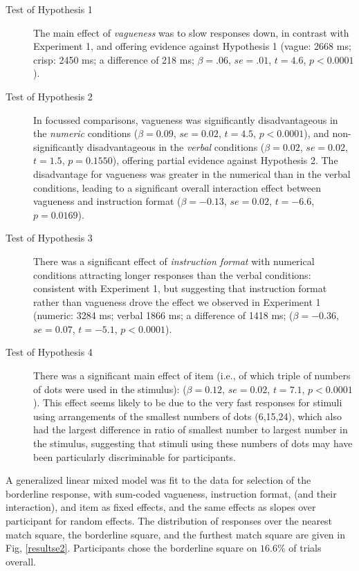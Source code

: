 \begin{description}
	\item [Test of Hypothesis 1] The main effect of \emph{vagueness} was to slow responses down, in contrast with Experiment 1, and offering evidence against Hypothesis 1 (vague: 2668 ms; crisp: 2450 ms; a difference of 218 ms; $\beta=.06$, $se=.01$, $t=4.6$, $p<0.0001$). 
	\item [Test of Hypothesis 2] In focussed comparisons, vagueness was significantly disadvantageous in the \emph{numeric} conditions ($\beta=0.09$, $se=0.02$, $t=4.5$, $p<0.0001$), and non-significantly disadvantageous in the \emph{verbal} conditions ($\beta=0.02$, $se=0.02$, $t=1.5$, $p=0.1550$), offering partial evidence against Hypothesis 2. The disadvantage for vagueness was greater in the numerical than in the verbal conditions, leading to a significant overall interaction effect between vagueness and instruction format ($\beta=-0.13$, $se=0.02$, $t=-6.6$, $p=0.0169$).
	\item [Test of Hypothesis 3] There was a significant effect of \emph{instruction format} with numerical conditions attracting longer responses than the verbal conditions: consistent with Experiment 1, but suggesting that instruction format rather than vagueness drove the effect we observed in Experiment 1 (numeric: 3284 ms; verbal 1866 ms; a difference of 1418 ms; ($\beta=-0.36$, $se=0.07$, $t=-5.1$, $p<0.0001$).
	\item [Test of Hypothesis 4] There was a significant main effect of item (i.e., of which triple of numbers of dots were used in the stimulus): ($\beta=0.12$, $se=0.02$, $t=7.1$, $p<0.0001$). This effect seems likely to be due to the very fast responses for stimuli using arrangements of the smallest numbers of dots (6,15,24), which also had the largest difference in ratio of smallest number to largest number in the stimulus, suggesting that stimuli using these numbers of dots may have been particularly discriminable for participants.
\end{description}

A generalized linear mixed model \citet{jaeger2008categorical} was fit to the data for selection of the borderline response, with sum-coded vagueness, instruction format, (and their interaction), and item as fixed effects, and the same effects as slopes over participant for random effects. The distribution of responses over the nearest match square, the borderline square, and the furthest match square are given in Fig, \ref{resultse2}. Participants chose the borderline square on $16.6\%$ of trials overall.

